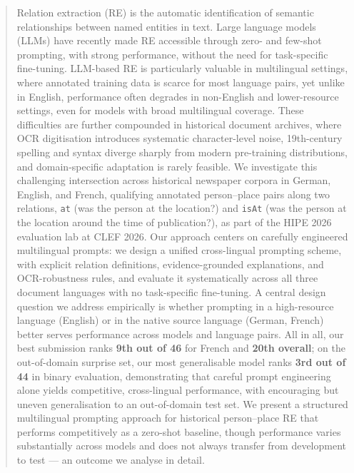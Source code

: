 \documentclass[
]{ceurart}
\theoremstyle{definition}
\begin{document}
\begin{abstract}
Relation extraction (RE) is the automatic identification of semantic relationships between named entities in text. Large language models (LLMs) have recently made RE accessible through zero- and few-shot prompting, with strong performance, without the need for task-specific fine-tuning.
LLM-based RE is particularly valuable in multilingual settings, where annotated training data is scarce for most language pairs, yet unlike in English, performance often degrades in non-English and lower-resource settings, even for models with broad multilingual coverage.
These difficulties are further compounded in historical document archives, where OCR digitisation introduces systematic character-level noise, 19th-century spelling and syntax diverge sharply from modern pre-training distributions, and domain-specific adaptation is rarely feasible.
We investigate this challenging intersection across historical newspaper corpora in German, English, and French, qualifying annotated person--place pairs along two relations, \texttt{at} (was the person at the location?) and \texttt{isAt} (was the person at the location around the time of publication?), as part of the HIPE 2026 evaluation lab at CLEF 2026.
Our approach centers on carefully engineered multilingual prompts: we design a unified cross-lingual prompting scheme, with explicit relation definitions, evidence-grounded explanations, and OCR-robustness rules, and evaluate it systematically across all three document languages with no task-specific fine-tuning. A central design question we address empirically is whether prompting in a high-resource language (English) or in the native source language (German, French) better serves performance across models and language pairs.
All in all, our best submission ranks \textbf{9th out of 46} for French and \textbf{20th overall}; on the out-of-domain surprise set, our most generalisable model ranks \textbf{3rd out of 44} in binary evaluation, demonstrating that careful prompt engineering alone yields competitive, cross-lingual performance, with encouraging but uneven generalisation to an out-of-domain test set.
We present a structured multilingual prompting approach for historical person--place RE that performs competitively as a zero-shot baseline, though performance varies substantially across models and does not always transfer from development to test --- an outcome we analyse in detail.
\end{abstract}
\end{document}
